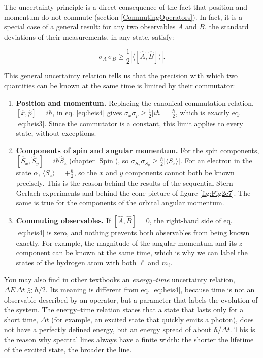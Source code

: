 \documentclass[
  english,
  9pt,
]{extbook}
\theoremstyle{definition}
\theoremstyle{definition}
\theoremstyle{definition}
\theoremstyle{definition}
\theoremstyle{remark}
\begin{document}
The uncertainty principle is a direct consequence of the fact that position and momentum do not commute (section \ref{CommutingOperators}). In fact, it is a special case of a general result: for any two observables \(A\) and \(B\), the standard deviations of their measurements, in any state, satisfy:

\begin{equation}
\sigma_A\,\sigma_B \geq \frac{1}{2}\left|\langle[\hat{A},\hat{B}]\rangle\right|.
\label{eq:heis4}
\end{equation}

This general uncertainty relation tells us that the precision with which two quantities can be known at the same time is limited by their commutator:

\begin{enumerate}
\def\labelenumi{\arabic{enumi}.}
\item
  \textbf{Position and momentum.} Replacing the canonical commutation relation, \([\hat{x},\hat{p}]=i\hbar\), in eq. \eqref{eq:heis4} gives \(\sigma_x\sigma_p\geq\frac{1}{2}|i\hbar|=\frac{\hbar}{2}\), which is exactly eq. \eqref{eq:heis3}. Since the commutator is a constant, this limit applies to every state, without exceptions.
\item
  \textbf{Components of spin and angular momentum.} For the spin components, \([\hat{S}_x,\hat{S}_y]=i\hbar\hat{S}_z\) (chapter \ref{Spin}), so \(\sigma_{S_x}\sigma_{S_y}\geq\frac{\hbar}{2}|\langle S_z\rangle|\). For an electron in the state \(\alpha\), \(\langle S_z\rangle=+\frac{\hbar}{2}\), so the \(x\) and \(y\) components cannot both be known precisely. This is the reason behind the results of the sequential Stern--Gerlach experiments and behind the cone picture of figure \ref{fig:Fig2c7}. The same is true for the components of the orbital angular momentum.
\item
  \textbf{Commuting observables.} If \([\hat{A},\hat{B}]=0\), the right-hand side of eq. \eqref{eq:heis4} is zero, and nothing prevents both observables from being known exactly. For example, the magnitude of the angular momentum and its \(z\) component can be known at the same time, which is why we can label the states of the hydrogen atom with both \(\ell\) and \(m_\ell\).
\end{enumerate}

You may also find in other textbooks an \emph{energy--time} uncertainty relation, \(\Delta E\,\Delta t\gtrsim\hbar/2\). Its meaning is different from eq. \eqref{eq:heis4}, because time is not an observable described by an operator, but a parameter that labels the evolution of the system. The energy--time relation states that a state that lasts only for a short time, \(\Delta t\) (for example, an excited state that quickly emits a photon), does not have a perfectly defined energy, but an energy spread of about \(\hbar/\Delta t\). This is the reason why spectral lines always have a finite width: the shorter the lifetime of the excited state, the broader the line.
\end{document}
